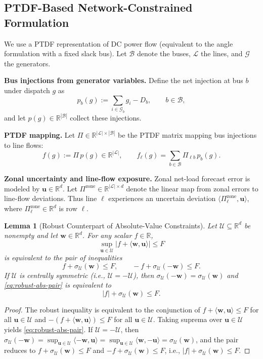 \documentclass[lettersize,journal]{IEEEtran}
\newcommand{\R}{\mathbb{R}}
\newcommand{\cU}{\mathcal{U}}
\newcommand{\cG}{\mathcal{G}}
\newcommand{\cL}{\mathcal{L}}
\newcommand{\cB}{\mathcal{B}}
\newcommand{\ip}[2]{\langle #1, #2 \rangle}
\newcommand{\bu}{\bm{u}}
\newcommand{\bw}{\bm{w}}
\newtheorem{lemma}[theorem]{Lemma}
\theoremstyle{definition}
\begin{document}
\subsection{PTDF-Based Network-Constrained Formulation}

We use a PTDF representation of DC power flow (equivalent to the angle formulation with a fixed slack bus).
Let $\cB$ denote the buses, $\cL$ the lines, and $\cG$ the generators.

\textbf{Bus injections from generator variables.}
Define the net injection at bus $b$ under dispatch $g$ as
\[
p_b(g) := \sum_{i\in\cG_b} g_i - D_b,
\qquad b\in\cB,
\]
and let $p(g)\in\R^{|\cB|}$ collect these injections.

\textbf{PTDF mapping.}
Let $\Pi\in\R^{|\cL|\times|\cB|}$ be the PTDF matrix mapping bus injections to line flows:
\[
f(g) := \Pi\,p(g)\in\R^{|\cL|},
\qquad
f_\ell(g) = \sum_{b\in\cB}\Pi_{\ell b}\,p_b(g).
\]

\textbf{Zonal uncertainty and line-flow exposure.}
Zonal net-load forecast error is modeled by $\bu\in\R^d$. Let $\Pi^{\text{zone}}\in\R^{|\cL|\times d}$ denote the linear map from zonal errors to line-flow deviations.
Thus line $\ell$ experiences an uncertain deviation $\ip{\Pi_\ell^{\text{zone}}}{\bu}$, where $\Pi_\ell^{\text{zone}}\in\R^d$ is row $\ell$.

\begin{lemma}[Robust Counterpart of Absolute-Value Constraints]\label{lem:robust-abs}
Let $\cU\subseteq\R^d$ be nonempty and let $\bw\in\R^d$. For any scalar $f\in\R$,
\[
\sup_{\bu\in\cU} \big| f + \ip{\bw}{\bu} \big|
\le F
\]
is equivalent to the pair of inequalities
\begin{equation}\label{eq:robust-abs-pair}
f + \sigma_{\cU}(\bw)\le F,
\qquad
-f + \sigma_{\cU}(-\bw)\le F.
\end{equation}
If $\cU$ is centrally symmetric (i.e., $\cU=-\cU$), then $\sigma_{\cU}(-\bw)=\sigma_{\cU}(\bw)$ and
\eqref{eq:robust-abs-pair} is equivalent to
\[
|f| + \sigma_{\cU}(\bw)\le F.
\]
\end{lemma}

\begin{proof}
The robust inequality is equivalent to the conjunction of
$f+\ip{\bw}{\bu}\le F$ for all $\bu\in\cU$ and $-(f+\ip{\bw}{\bu})\le F$ for all $\bu\in\cU$.
Taking suprema over $\bu\in\cU$ yields \eqref{eq:robust-abs-pair}.
If $\cU=-\cU$, then $\sigma_{\cU}(-\bw)=\sup_{\bu\in\cU}\ip{-\bw}{\bu}=\sup_{\bu\in\cU}\ip{\bw}{-\bu}=\sigma_{\cU}(\bw)$,
and the pair reduces to $f+\sigma_{\cU}(\bw)\le F$ and $-f+\sigma_{\cU}(\bw)\le F$, i.e., $|f|+\sigma_{\cU}(\bw)\le F$.
\end{proof}
\end{document}
